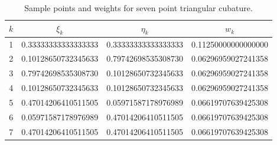 \begin{table}
  \begin{center}
    \begin{tabular}{|c|c|c|c|}  \hline
      {\boldmath $k$\unboldmath\rule[-.5ex]{0ex}{3ex}} &  
      {\boldmath $\xi_k$} \unboldmath  & 
      {\boldmath $\eta_k$ \unboldmath} & {\boldmath $w_k$ \unboldmath} 
      \\ \hline
      1 & 0.33333333333333333 & 0.33333333333333333 & 0.11250000000000000 \\
      2 & 0.10128650732345633 & 0.79742698535308730 & 0.06296959027241358 \\
      3 & 0.79742698535308730 & 0.10128650732345633 & 0.06296959027241358 \\
      4 & 0.10128650732345633 & 0.10128650732345633 & 0.06296959027241358 \\
      5 & 0.47014206410511505 & 0.05971587178976989 & 0.06619707639425308 \\
      6 & 0.05971587178976989 & 0.47014206410511505 & 0.06619707639425308 \\
      7 & 0.47014206410511505 & 0.47014206410511505 & 0.06619707639425308 \\
      \hline 
    \end{tabular}
  \end{center}
  \caption{Sample points and weights for seven point triangular cubature.}
  \label{tab:tri}
\end{table}

